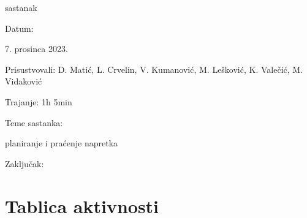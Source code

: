 \begin{packed_enum}
\begin{packed_item}
			
			\end{packed_item}

			\item  sastanak
			\item[] \begin{packed_item}
				\item Datum: \date[{7. prosinca 2023.}
				\item Prisustvovali: D. Matić, L. Crvelin, V. Kumanović, M. Lešković, K. Valečić, M. Vidaković
				\item Trajanje: 1h 5min
				\item Teme sastanka: 
				\begin{packed_item}
					\item  planiranje i praćenje napretka
				\end{packed_item}
                \item Zaključak: \\
                
			
			\end{packed_item}
		\end{packed_enum}
		
		\eject
		\section*{Tablica aktivnosti}

